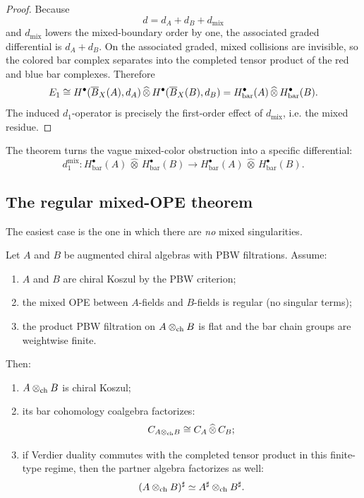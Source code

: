 \begin{proof}
Because
\[
d=d_A+d_B+d_{\mathrm{mix}}
\]
and \(d_{\mathrm{mix}}\) lowers the mixed-boundary order by one, the associated graded differential is \(d_A+d_B\). On the associated graded, mixed collisions are invisible, so the colored bar complex separates into the completed tensor product of the red and blue bar complexes. Therefore
\[
E_1 \cong H^\bullet(\overline{B}_X(A),d_A)\,\widehat\otimes\, H^\bullet(\overline{B}_X(B),d_B)
=
H^\bullet_{\mathrm{bar}}(A)\,\widehat\otimes\, H^\bullet_{\mathrm{bar}}(B).
\]
The induced \(d_1\)-operator is precisely the first-order effect of \(d_{\mathrm{mix}}\), i.e. the mixed residue.
\end{proof}

The theorem turns the vague mixed-color obstruction into a specific differential:
\[
d_1^{\mathrm{mix}}:H^\bullet_{\mathrm{bar}}(A)\,\widehat\otimes\, H^\bullet_{\mathrm{bar}}(B)\to
H^\bullet_{\mathrm{bar}}(A)\,\widehat\otimes\, H^\bullet_{\mathrm{bar}}(B).
\]

\subsection{The regular mixed-OPE theorem}

The easiest case is the one in which there are \emph{no} mixed singularities.

\begin{theorem}\label{thm:pbw-regular}
Let \(A\) and \(B\) be augmented chiral algebras with PBW filtrations. Assume:
\begin{enumerate}[label=\textup{(\alph*)},leftmargin=2.4em]
\item \(A\) and \(B\) are chiral Koszul by the PBW criterion;
\item the mixed OPE between \(A\)-fields and \(B\)-fields is regular (no singular terms);
\item the product PBW filtration on \(A\otimes_{\mathrm{ch}} B\) is flat and the bar chain groups are weightwise finite.
\end{enumerate}
Then:
\begin{enumerate}[label=\textup{(\roman*)},leftmargin=2.4em]
\item \(A\otimes_{\mathrm{ch}} B\) is chiral Koszul;
\item its bar cohomology coalgebra factorizes:
\[
C_{A\otimes_{\mathrm{ch}} B}\cong C_A\,\widehat\otimes\,C_B;
\]
\item if Verdier duality commutes with the completed tensor product in this finite-type regime, then the partner algebra factorizes as well:
\[
(A\otimes_{\mathrm{ch}} B)^\sharp \simeq A^\sharp\otimes_{\mathrm{ch}} B^\sharp.
\]
\end{enumerate}
\end{theorem}

